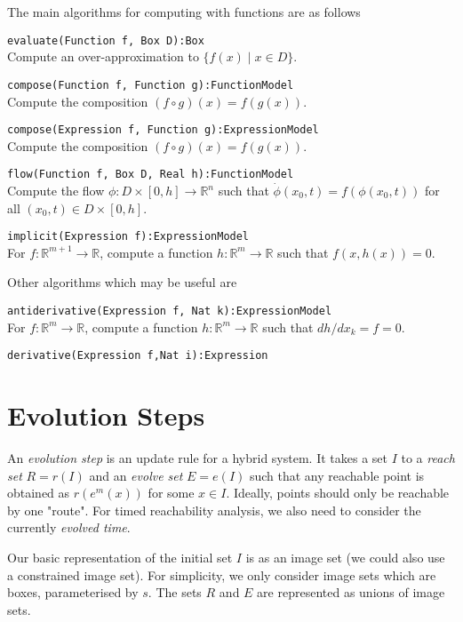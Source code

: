 \documentclass[english,a4paper]{article}
\newcommand{\R}{\mathbb{R}}
\theoremstyle{theorem}
\theoremstyle{definition}
\theoremstyle{remark}
\begin{document}
The main algorithms for computing with functions are as follows
\begin{description}
\item \texttt{evaluate(Function f, Box D):Box}\\ Compute an over-approximation to $\{ f(x) \mid x\in D\}$.
\item \texttt{compose(Function f, Function g):FunctionModel}\\ Compute the composition $(f\circ g)(x)=f(g(x))$.
\item \texttt{compose(Expression f, Function g):ExpressionModel}\\ Compute the composition $(f\circ g)(x)=f(g(x))$.
\item \texttt{flow(Function f, Box D, Real h):FunctionModel}\\ Compute the flow $\phi:D\times[0,h]\rightarrow \R^n$ such that $\dot{\phi}(x_0,t)=f(\phi(x_0,t))$ for all $(x_0,t)\in D\times[0,h]$.
\item \texttt{implicit(Expression f):ExpressionModel}\\ For $f:\R^{m+1}\rightarrow\R$, compute a function $h:\R^{m}\rightarrow\R$ such that $f(x,h(x))=0$.
\end{description}
Other algorithms which may be useful are
\begin{description}
\item \texttt{antiderivative(Expression f, Nat k):ExpressionModel}\\ For $f:\R^{m}\rightarrow\R$, compute a function $h:\R^{m}\rightarrow\R$ such that $dh/dx_k=f=0$.
\item \texttt{derivative(Expression f,Nat i):Expression}
\end{description}

\section{Evolution Steps}

An \emph{evolution step} is an update rule for a hybrid system. It takes a set $I$ to a \emph{reach set} $R=r(I)$ and an \emph{evolve set} $E=e(I)$ such that any reachable point is obtained as $r(e^m(x))$ for some $x\in I$. Ideally, points should only be reachable by one "route". For timed reachability analysis, we also need to consider the currently \emph{evolved time}.

Our basic representation of the initial set $I$ is as an image set (we could also use a constrained image set). For simplicity, we only consider image sets which are boxes, parameterised by $s$. The sets $R$ and $E$ are represented as unions of image sets.
\end{document}
